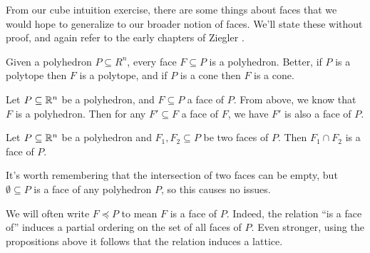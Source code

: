 \documentclass[12pt,oneside]{../../sfsuthesis}
\begin{document}
From our cube intuition exercise, there are some things about faces that we would hope to generalize to our broader notion of faces.
We'll state these without proof, and again refer to the early chapters of Ziegler \cite{zieglerLecturesPolytopes1995}.
\begin{proposition}
    Given a polyhedron \( P \subseteq R^n \), every face \( F \subseteq P \) is a polyhedron.
    Better, if \( P \) is a polytope then \( F \) is a polytope, and if \( P \) is a cone then \( F \) is a cone.
\end{proposition}
\begin{proposition}
    Let \( P \subseteq \mathbb{R}^n \) be a polyhedron, and \( F \subseteq P \) a face of \( P \).
    From above, we know that \( F \) is a polyhedron.
    Then for any \( F' \subseteq F \) a face of \( F \), we have \( F' \) is also a face of \( P \).
\end{proposition}
\begin{proposition}
    Let \( P \subseteq \mathbb{R}^n \) be a polyhedron and \( F_1, F_2 \subseteq P \) be two faces of \( P \).
    Then \( F_1 \cap F_2 \) is a face of \( P \).
\end{proposition}
It's worth remembering that the intersection of two faces can be empty, but \( \emptyset \subseteq P \) is a face of any polyhedron \( P \), so this causes no issues.

We will often write \( F \preceq P \) to mean \( F \) is a face of \( P \).
Indeed, the relation ``is a face of'' induces a partial ordering on the set of all faces of \( P \).
Even stronger, using the propositions above it follows that the relation induces a lattice.
\end{document}
